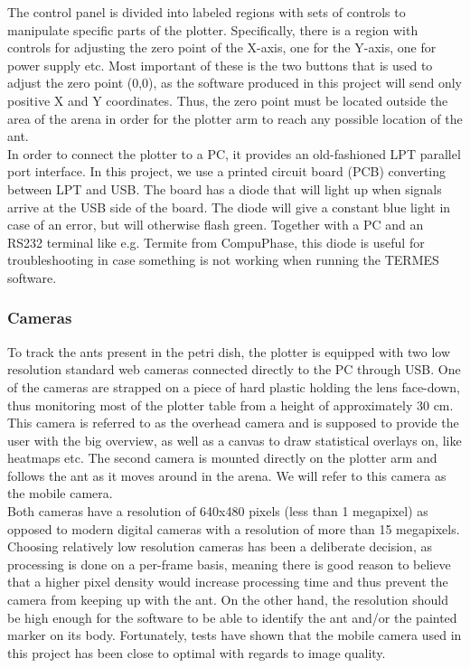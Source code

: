 The control panel is divided into labeled regions with sets of controls to manipulate specific parts of the plotter. Specifically, there is a region with controls for adjusting the zero point of the X-axis, one for the Y-axis, one for power supply etc. Most important of these is the two buttons that is used to adjust the zero point (0,0), as the software produced in this project will send only positive X and Y coordinates. Thus, the zero point must be located outside the area of the arena in order for the plotter arm to reach any possible location of the ant. \\

In order to connect the plotter to a PC, it provides an old-fashioned LPT parallel port interface. In this project, we use a printed circuit board (PCB) converting between LPT and USB. The board has a diode that will light up when signals arrive at the USB side of the board. The diode will give a constant blue light in case of an error, but will otherwise flash green. Together with a PC and an RS232 terminal like e.g. Termite from CompuPhase, this diode is useful for troubleshooting in case something is not working when running the TERMES software. \\ 

\subsubsection{Cameras}
To track the ants present in the petri dish, the plotter is equipped with two low resolution standard web cameras connected directly to the PC through USB. One of the cameras are strapped on a piece of hard plastic holding the lens face-down, thus monitoring most of the plotter table from a height of approximately 30 cm. This camera is referred to as the overhead camera and is supposed to provide the user with the big overview, as well as a canvas to draw statistical overlays on, like heatmaps etc. The second camera is mounted directly on the plotter arm and follows the ant as it moves around in the arena. We will refer to this camera as the mobile camera. \\

Both cameras have a resolution of 640x480 pixels (less than 1 megapixel) as opposed to modern digital cameras with a resolution of more than 15 megapixels. Choosing relatively low resolution cameras has been a deliberate decision, as processing is done on a per-frame basis, meaning there is good reason to believe that a higher pixel density would increase processing time and thus prevent the camera from keeping up with the ant. On the other hand, the resolution should be high enough for the software to be able to identify the ant and/or the painted marker on its body. Fortunately, tests have shown that the mobile camera used in this project has been close to optimal with regards to image quality. \\

